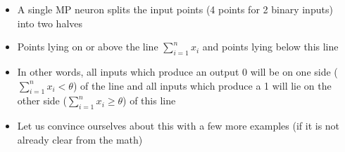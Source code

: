 \begin{frame}
\begin{columns}
\begin{overlayarea}{\textwidth}{\textheight}
\begin{center}
{
				}
			\end{center}
		\end{overlayarea}

		\begin{overlayarea}{\textwidth}{\textheight}
			\begin{itemize}\justifying
				\item<4-> A single MP neuron splits the input points (4 points for 2 binary inputs) into two halves
				\item<5-> Points lying on or above the line $\sum_{i=1}^{n} x_i$ and points lying below this line
				\item<6-> In other words, all inputs which produce an output 0 will be on one side ($\sum_{i=1}^{n} x_i < \theta$) of the line and all inputs which produce a 1 will lie on the other side ($\sum_{i=1}^{n} x_i \geq \theta$) of this line
				\item<7-> Let us convince ourselves about this with a few more examples (if it is not already clear from the math)
			\end{itemize}
		\end{overlayarea}
	\end{columns}
\end{frame}


